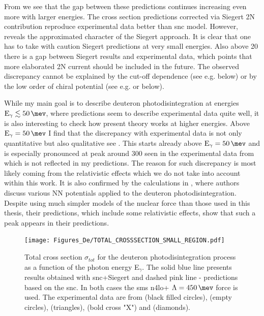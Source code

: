     From  we see that the gap between these predictions
    continues increasing even more with larger energies.
    The cross section predictions corrected via Siegert 2N contribution reproduce 
    experimental data better than \gls{snc} model.
    However,  reveals the approximated character of the Siegert approach.
    It is clear that one has to take with caution Siegert predictions at very small energies.
    Also above \SI{20}{\mev} there is a gap between Siegert results and experimental data,
    which points that more elaborated 2N current should be included in the future.
    The observed discrepancy cannot be explained by the cut-off dependence
    (see e.g.  below) or by the low order of chiral potential (see e.g.  or  below).

    While my main goal is to describe deuteron photodisintegration
    at energies $\text{E}_\gamma \lesssim \SI{50}{\mev}$, 
    where predictions seem to describe experimental data quite well,
    it is also interesting to check how 
    present theory works at higher energies.
    Above $\text{E}_\gamma=\SI{50}{\mev}$
    I find that the discrepancy with experimental data is not only 
    quantitative but also qualitative see .  
    This starts already above $\text{E}_\gamma=\SI{50}{\mev}$ and is especially pronounced at peak around \SI{300}{\mev}
    seen in the experimental data from \cite{Bernabei1986} which is not
    reflected in my predictions. The reason for such discrepancy 
    is most likely coming from the relativistic effects
    which we do not take into account within this work.
    It is also confirmed by the calculations in \cite{ArenhovelPhotodisint1991},
    where authors discuss various NN potentials applied to the deuteron photodisintegration.
    Despite using much simpler models of the nuclear force than those used in this thesis,
    their predictions, which include some relativistic effects, show that such a peak appears in their predictions. 
    
    \begin{figure}[h]
        \begin{center}
        \texttt{[image: Figures\_De/TOTAL\_CROSSSECTION\_SMALL\_REGION.pdf]}
        \end{center}
        \caption{Total cross section $\sigma_{tot}$ for the deuteron photodisintegration process
        as a function of the photon energy E$_\gamma$.
        The solid blue line presents results obtained with \gls{snc}+Siegert 
        and dashed pink line - predictions based on the \gls{snc}.
        In both cases the \gls{sms} \gls{n4lo+} $\Lambda=\SI{450}{\mev}$ force is used.
        The experimental data are from \cite{Bernabei1986} (black filled circles),
        \cite{BOSMAN1979} (empty circles),
        \cite{Skopik1974} (triangles),
        \cite{Moreh1989} (bold cross "X") and
        \cite{Birenbaum1985} (diamonds).
        }
        \label{TOTAL_CROSS_small}
    \end{figure}

